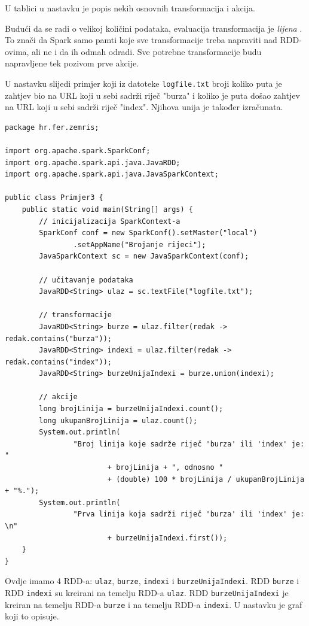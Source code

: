 \documentclass[times, utf8, zavrsni]{fer}
\begin{document}
U tablici u nastavku je popis nekih osnovnih transformacija i akcija.

Budući da se radi o velikoj količini podataka, evaluacija transformacija je \emph{lijena} . To znači da Spark samo pamti koje sve transformacije treba napraviti nad RDD-ovima, ali ne i da ih odmah odradi. Sve potrebne transformacije budu napravljene tek pozivom prve akcije. 

U nastavku slijedi primjer koji iz datoteke \texttt{logfile.txt} broji koliko puta je zahtjev bio na URL koji u sebi sadrži riječ "burza" i koliko je puta došao zahtjev na URL koji u sebi sadrži riječ "index". Njihova unija je također izračunata.
 
\vspace{5mm}
\begin{lstlisting}
package hr.fer.zemris;

import org.apache.spark.SparkConf;
import org.apache.spark.api.java.JavaRDD;
import org.apache.spark.api.java.JavaSparkContext;

public class Primjer3 {
	public static void main(String[] args) {
		// inicijalizacija SparkContext-a
		SparkConf conf = new SparkConf().setMaster("local")
				.setAppName("Brojanje rijeci");
		JavaSparkContext sc = new JavaSparkContext(conf);

		// učitavanje podataka
		JavaRDD<String> ulaz = sc.textFile("logfile.txt");

		// transformacije
		JavaRDD<String> burze = ulaz.filter(redak -> redak.contains("burza"));
		JavaRDD<String> indexi = ulaz.filter(redak -> redak.contains("index"));
		JavaRDD<String> burzeUnijaIndexi = burze.union(indexi);

		// akcije
		long brojLinija = burzeUnijaIndexi.count();
		long ukupanBrojLinija = ulaz.count();
		System.out.println(
				"Broj linija koje sadrže riječ 'burza' ili 'index' je: "
						+ brojLinija + ", odnosno "
						+ (double) 100 * brojLinija / ukupanBrojLinija + "%.");
		System.out.println(
				"Prva linija koja sadrži riječ 'burza' ili 'index' je: \n"
						+ burzeUnijaIndexi.first());
	}
}
\end{lstlisting}
\vspace{5mm}

Ovdje imamo 4 RDD-a: \texttt{ulaz}, \texttt{burze}, \texttt{indexi} i \texttt{burzeUnijaIndexi}. RDD \texttt{burze} i RDD \texttt{indexi} su kreirani na temelju RDD-a \texttt{ulaz}. RDD \texttt{burzeUnijaIndexi} je kreiran na temelju RDD-a \texttt{burze} i na temelju RDD-a \texttt{indexi}. U nastavku je graf koji to opisuje.
\end{document}
